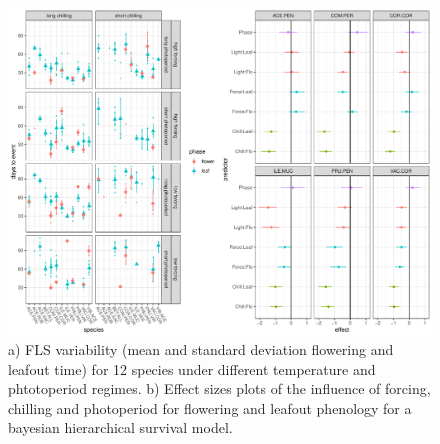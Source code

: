 \documentclass[12pt]{article}\usepackage[]{graphicx}\usepackage[]{color}
\begin{document}
\begin{center}
\begin{figure}[here]
\includegraphics[width=16 cm]{..//figures/Quals_plots.pdf}
\caption{a) FLS variability (mean and standard deviation flowering and leafout time) for 12 species under different temperature and phtotoperiod regimes. b) Effect sizes plots of the influence of forcing, chilling and photoperiod for flowering and leafout phenology for a bayesian hierarchical survival model.}
\label{fig:Figure 4}
\end{figure}
\end{center}
%
%
\end{document}
